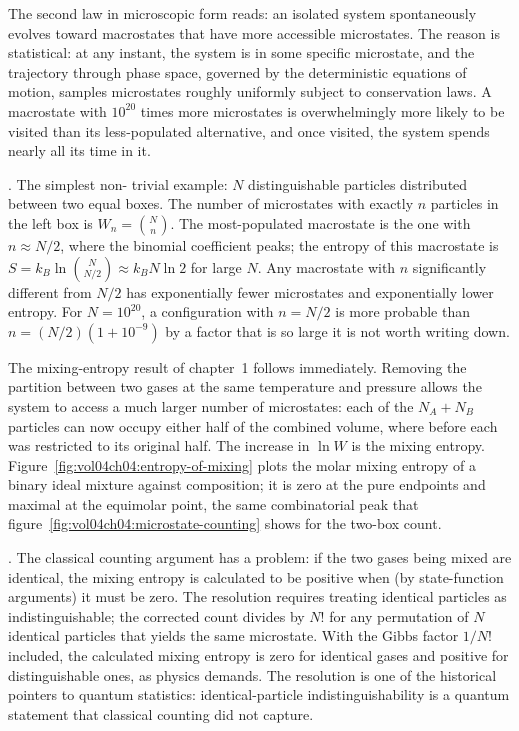 The second law in microscopic form reads: an isolated system
spontaneously evolves toward macrostates that have more accessible
microstates. The reason is statistical: at any instant, the system
is in some specific microstate, and the trajectory through phase
space, governed by the deterministic equations of motion, samples
microstates roughly uniformly subject to conservation laws. A
macrostate with $10^{20}$ times more microstates is overwhelmingly
more likely to be visited than its less-populated alternative, and
once visited, the system spends nearly all its time in it.

. The simplest non-
trivial example: $N$ distinguishable particles distributed between
two equal boxes. The number of microstates with exactly $n$
particles in the left box is $W_n = \binom{N}{n}$. The most-populated
macrostate is the one with $n \approx N/2$, where the binomial
coefficient peaks; the entropy of this macrostate is $S = k_B \ln
\binom{N}{N/2} \approx k_B N \ln 2$ for large $N$. Any macrostate
with $n$ significantly different from $N/2$ has exponentially fewer
microstates and exponentially lower entropy. For $N = 10^{20}$, a
configuration with $n = N/2$ is more probable than $n = (N/2)(1 +
10^{-9})$ by a factor that is so large it is not worth writing down.



The mixing-entropy result of chapter~1 follows immediately. Removing
the partition between two gases at the same temperature and pressure
allows the system to access a much larger number of microstates: each
of the $N_A + N_B$ particles can now occupy either half of the
combined volume, where before each was restricted to its original
half. The increase in $\ln W$ is the mixing entropy. Figure~\ref{fig:vol04ch04:entropy-of-mixing}
plots the molar mixing entropy of a binary ideal mixture against
composition; it is zero at the pure endpoints and maximal at the
equimolar point, the same combinatorial peak that
figure~\ref{fig:vol04ch04:microstate-counting} shows for the
two-box count.



. The classical
counting argument has a problem: if the two gases being mixed are
identical, the mixing entropy is calculated to be positive when (by
state-function arguments) it must be zero. The resolution requires
treating identical particles as indistinguishable; the corrected
count divides by $N!$ for any permutation of $N$ identical particles
that yields the same microstate. With the Gibbs factor $1/N!$
included, the calculated mixing entropy is zero for identical gases
and positive for distinguishable ones, as physics demands. The
resolution is one of the historical pointers to quantum statistics:
identical-particle indistinguishability is a quantum statement that
classical counting did not capture.

